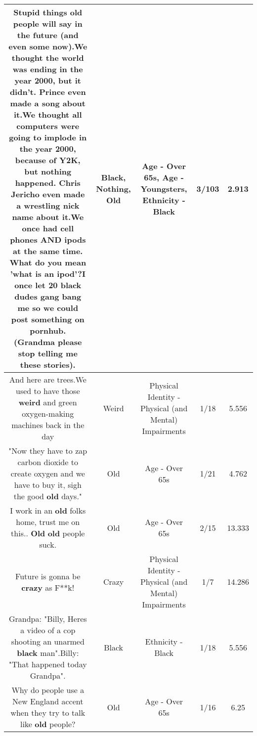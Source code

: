 \documentclass[11pt]{article}
\newlength\mylength
\begin{document}
\begin{center}
\begin{longtable}{|C{.65\mylength}|C{.30\mylength}|C{.12\mylength}|C{.12\mylength}|C{.12\mylength}|}
  \small Stupid things \textbf{old} people will say in the future (and even some now).We thought the world was ending in the year 2000, but it didn't. Prince even made a song about it.We thought all computers were going to implode in the year 2000, because of Y2K, but \textbf{nothing} happened. Chris Jericho even made a wrestling nick name about it.We once had cell phones AND ipods at the same time. What do you mean 'what is an ipod'?I once let 20 \textbf{black} dudes gang bang me so we could post something on pornhub. (Grandma please stop telling me these stories).\normalsize   & Black, Nothing, Old & Age - Over 65s, Age - Youngsters, Ethnicity - Black & 3/103 & 2.913 \\  \hline
  \small And here are trees.We used to have those \textbf{weird} and green oxygen-making machines back in the day\normalsize   & Weird & Physical Identity - Physical (and Mental) Impairments & 1/18 & 5.556 \\  \hline
  \small "Now they have to zap carbon dioxide to create oxygen and we have to buy it, sigh the good \textbf{old} days."\normalsize   & Old & Age - Over 65s & 1/21 & 4.762 \\  \hline
  \small I work in an \textbf{old} folks home, trust me on this.. \textbf{Old} \textbf{old} people suck.\normalsize   & Old & Age - Over 65s & 2/15 & 13.333 \\  \hline
  \small Future is gonna be \textbf{crazy} as F**k!\normalsize   & Crazy & Physical Identity - Physical (and Mental) Impairments & 1/7 & 14.286 \\  \hline
  \small Grandpa: "Billy, Heres a video of a cop shooting an unarmed \textbf{black} man".Billy: "That happened today Grandpa".\normalsize   & Black & Ethnicity - Black & 1/18 & 5.556 \\  \hline
  \small Why do people use a New England accent when they try to talk like \textbf{old} people?\normalsize   & Old & Age - Over 65s & 1/16 & 6.25 \\  \hline

\end{longtable}
\end{center}
\end{document}

